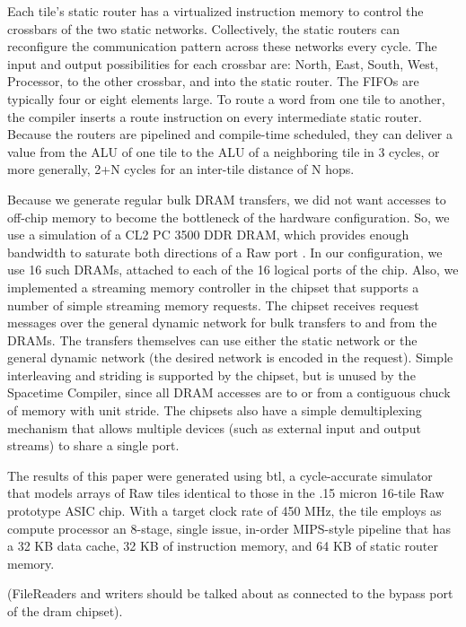 Each tile's static router has a virtualized instruction memory to
control the crossbars of the two static networks. Collectively, the
static routers can reconfigure the communication pattern across these
networks every cycle.  The input and output possibilities for each
crossbar are: North, East, South, West, Processor, to the other
crossbar, and into the static router. The FIFOs are typically four or
eight elements large.  To route a word from one tile to another, the
compiler inserts a route instruction on every intermediate static
router.  Because the routers are pipelined and compile-time scheduled,
they can deliver a value from the ALU of one tile to the ALU of a
neighboring tile in 3 cycles, or more generally, 2+N cycles for an
inter-tile distance of N hops.

Because we generate regular bulk DRAM transfers, we did not want
accesses to off-chip memory to become the bottleneck of the hardware
configuration.  So, we use a simulation of a CL2 PC 3500 DDR DRAM,
which provides enough bandwidth to saturate both directions of a Raw
port \cite{raw_isca}.  In our configuration, we use 16 such DRAMs,
attached to each of the 16 logical ports of the chip.  Also, we
implemented a streaming memory controller in the chipset that supports
a number of simple streaming memory requests.  The chipset receives
request messages over the general dynamic network for bulk transfers
to and from the DRAMs.  The transfers themselves can use either the
static network or the general dynamic network (the desired network is
encoded in the request).  Simple interleaving and striding is
supported by the chipset, but is unused by the Spacetime Compiler,
since all DRAM accesses are to or from a contiguous chuck of memory
with unit stride. The chipsets also have a simple demultiplexing
mechanism that allows multiple devices (such as external input and
output streams) to share a single port.

The results of this paper were generated using btl, a cycle-accurate
simulator that models arrays of Raw tiles identical to those in the
.15 micron 16-tile Raw prototype ASIC chip.  With a target clock rate
of 450 MHz, the tile employs as compute processor an 8-stage, single
issue, in-order MIPS-style pipeline that has a 32 KB data cache, 32 KB
of instruction memory, and 64 KB of static router memory.

(FileReaders and writers should be talked about as connected to the
bypass port of the dram chipset).